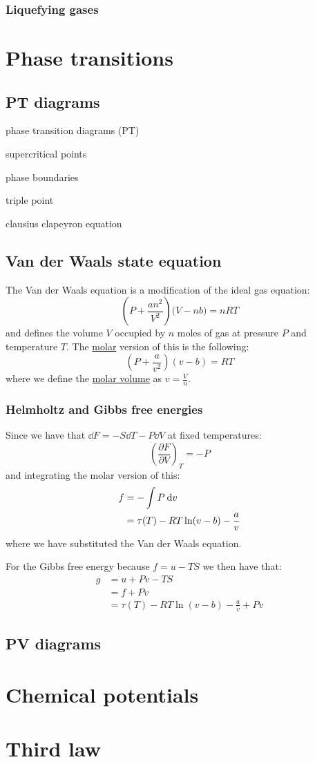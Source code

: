 \documentclass{article}
\begin{document}
\subsubsection{Liquefying gases}

\newpage

\section{Phase transitions}

\subsection{PT diagrams}
phase transition diagrams (PT)

supercritical points

phase boundaries

triple point

clausius clapeyron equation

\newpage

\subsection{Van der Waals state equation}
The Van der Waals equation is a modification of the 
ideal gas equation:
$$\left(P+\frac{an^2}{V^2}\right)
\bigl(V-nb\bigr)=nRT$$
and defines the volume $V$ occupied by $n$ moles of gas
at pressure $P$ and temperature $T$.
The \underline{molar} version of this is the following:
$$\left(P+\frac{a}{v^2}\right)(v-b)=RT$$
where we define the \underline{molar volume}
as $v=\frac{V}{n}$.

\subsubsection{Helmholtz and Gibbs free energies}
Since we have that
$\dd F=-S\dd T-P\dd V$ at fixed temperatures:
$$\left(\frac{\partial F}{\partial V}\right)_T=-P$$
and integrating the molar version of this:
\begin{align*}
    f
    &=-\int P\hspace{0.03in}\dd v \\
    &=\tau(T)-RT\ln(v-b)-\frac{a}{v}
\end{align*}
where we have substituted the Van der Waals equation.

For the Gibbs free energy because
$f=u-TS$ we then have that:
\begin{align*}
    g
    &=u+Pv-TS \\
    &=f+Pv \\
    &=\tau(T)-RT\ln(v-b)-\frac{a}{v}+Pv
\end{align*}


\newpage

\subsection{PV diagrams}

\newpage

\section{Chemical potentials}

\newpage

\section{Third law}
\end{document}
